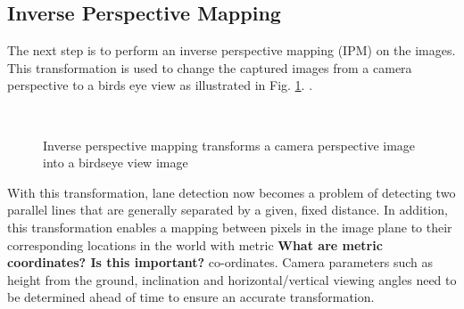 \documentclass{article}
\begin{document}
\subsection{Inverse Perspective Mapping}
The next step is to perform an inverse perspective mapping (IPM) on the images.  This transformation is used to change the captured images from a camera perspective to a birds eye view as illustrated in Fig. \ref{fig:ipm}.
\cite{sehestedt_robust_2007,shu_vision_2004,bertozzi_gold:parallel_1998}.
\begin{figure}[htb]
  \centering
    \hspace{0.00001in}
      \\
  \caption{Inverse perspective mapping transforms a camera perspective image into a birdseye view image}
  \label{fig:ipm}
\end{figure}
With this transformation, lane detection now becomes a problem of detecting two parallel lines that are generally separated by a given, fixed distance.
In addition, this transformation enables a mapping between pixels in the image plane to their corresponding locations in the world with metric {\bf What are metric coordinates? Is this important?} co-ordinates. Camera parameters such as height from the ground, inclination and horizontal/vertical viewing angles need to be determined ahead of time to ensure an accurate transformation.
\end{document}
